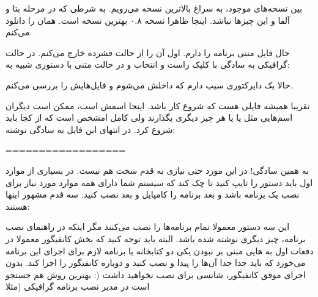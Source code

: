 بین نسخه‌های موجود، به سراغ بالاترین نسخه می‌رویم. به شرطی که در مرحله بتا و آلفا و این چیزها نباشد. اینجا ظاهرا نسخه ۰.۸ بهترین نسخه است.
همان را دانلود می‌کنم.

حال فایل متنی برنامه را دارم. اول آن را از حالت فشرده خارج می‌کنم. در حالت گرافیکی به سادگی با کلیک راست و انتخاب 
 و در حالت متنی با دستوری شبیه به:
\begin{mybox}
\flushleft
{}

\end{mybox}
حالا یک دایرکتوری سیب دارم که داخلش می‌شوم و فایل‌هایش را بررسی می‌کنم.
\begin{mybox}
\flushleft
{}




\end{mybox}
تقریبا همیشه فایلی هست که شروع کار باشد. اینجا اسمش 
 است، ممکن است دیگران اسم‌هایی مثل 
 یا 
 یا هر چیز دیگری بگذارند ولی کامل امشخص است که از کجا باید شروع کرد. در انتهای این فایل به سادگی نوشته:
\begin{mybox}
\flushleft
{}

==================



\end{mybox}
به همین سادگی! در این مورد حتی نیازی به قدم سخت 
 هم نیست. در بسیاری از موارد اول باید دستور 
 را تایپ کنید تا چک کند که سیستم شما دارای همه موارد مورد نیاز برای نصب یک برنامه باشد و بعد برنامه را کامپایل و بعد نصب کنید. سه قدم مشهور اینها هستند:
\begin{mybox}
\flushleft
{}





\end{mybox}
این سه دستور معمولا تمام برنامه‌ها را نصب می‌کنند مگر اینکه در راهنمای نصب برنامه، چیز دیگری نوشته شده باشد. البته باید توجه کنید که بخش کانفیگور معمولا در دفعات اول به 
هایی مبنی بر نبودن یکی دو کتابخانه یا برنامه لازم برای اجرای این برنامه می‌خورد که باید جدا جدا آن‌ها را پیدا و نصب کنید و دوباره کانفیگور را اجرا کند. بدون اجرای موفق کانفیگور، شانسی برای نصب نخواهید داشت (: بهترین روش هم جستجو است در مدیر نصب برنامه گرافیکی (مثلا 
